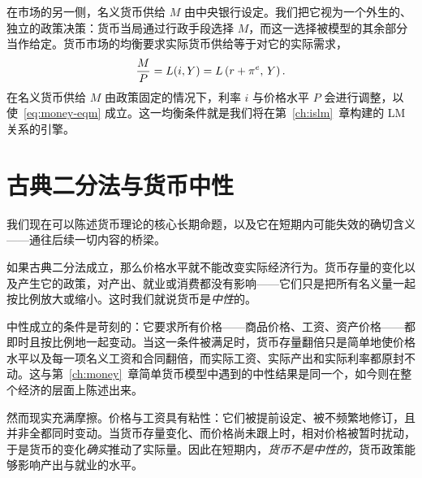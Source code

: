 
在市场的另一侧，名义货币供给 $M$ 由中央银行设定。我们把它视为一个外生的、独立的政策决策：货币当局通过行政手段选择 $M$，而这一选择被模型的其余部分当作给定。货币市场的均衡要求实际货币供给等于对它的实际需求，
\begin{equation}
\frac{M}{P} = L(i, Y) = L\left(r + \pi^{e},\, Y\right).
\label{eq:money-eqm}
\end{equation}
在名义货币供给 $M$ 由政策固定的情况下，利率 $i$ 与价格水平 $P$ 会进行调整，以使~\eqref{eq:money-eqm} 成立。这一均衡条件就是我们将在第~\ref{ch:islm}~章构建的 LM 关系的引擎。

\section{古典二分法与货币中性}

我们现在可以陈述货币理论的核心长期命题，以及它在短期内可能失效的确切含义——通往后续一切内容的桥梁。


如果古典二分法成立，那么价格水平就不能改变实际经济行为。货币存量的变化以及产生它的政策，对产出、就业或消费都没有影响——它们只是把所有名义量一起按比例放大或缩小。这时我们就说货币是\emph{中性}的。


中性成立的条件是苛刻的：它要求所有价格——商品价格、工资、资产价格——都即时且按比例地一起变动。当这一条件被满足时，货币存量翻倍只是简单地使价格水平以及每一项名义工资和合同翻倍，而实际工资、实际产出和实际利率都原封不动。这与第~\ref{ch:money}~章简单货币模型中遇到的中性结果是同一个，如今则在整个经济的层面上陈述出来。

然而现实充满摩擦。价格与工资具有粘性：它们被提前设定、被不频繁地修订，且并非全都同时变动。当货币存量变化、而价格尚未跟上时，相对价格被暂时扰动，于是货币的变化\emph{确实}推动了实际量。因此在短期内，\emph{货币不是中性的}，货币政策能够影响产出与就业的水平。

